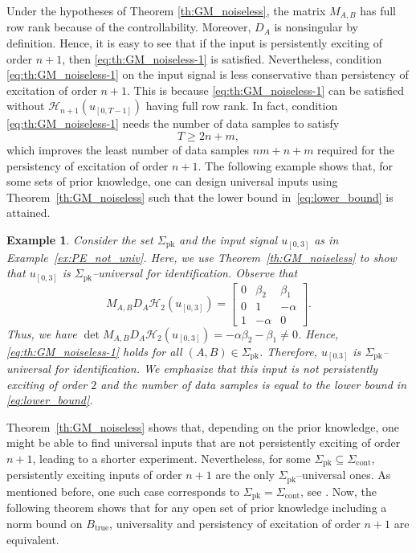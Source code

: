 \documentclass[journal,twoside,web]{ieeecolor}
\newtheorem{example}[theorem]{Example}
\begin{document}
Under the hypotheses of Theorem \ref{th:GM_noiseless}, the matrix $M_{A,B}$ has full row rank because of the controllability. Moreover, $D_A$ is nonsingular by definition. Hence, it is easy to see that if the input is persistently exciting of order $n+1$, then \eqref{eq:th:GM_noiseless-1} is satisfied. Nevertheless, condition \eqref{eq:th:GM_noiseless-1} on the input signal is less conservative than persistency of excitation of order $n+1$. This is because \eqref{eq:th:GM_noiseless-1} can be satisfied without $\mathcal{H}_{n+1}(u_{[0,T-1]}) $ having full row rank. In fact, condition \eqref{eq:th:GM_noiseless-1} needs the number of data samples to satisfy
\begin{equation}
\label{eq:lower_bound}
T\geq2n+m,
\end{equation}
which improves the least number of data samples $nm+n+m$ required for the persistency of excitation of order $n+1$. The following example shows that, for some sets of prior knowledge, one can design universal inputs using Theorem~\ref{th:GM_noiseless} such that the lower bound in~\eqref{eq:lower_bound} is attained.

\begin{example}
Consider the set $\Sigma_\text{pk}$ and the input signal $u_{[0,3]}$ as in Example~\ref{ex:PE_not_univ}. Here, we use Theorem~\ref{th:GM_noiseless} to show that $u_{[0,3]}$ is $\Sigma_\text{pk}$--universal for identification. Observe that 
\begin{equation}
M_{A,B}D_A\mathcal{H}_{2}(u_{[0,3]})=\begin{bmatrix}
0 & \beta_2 & \beta_1 \\
0 & 1  & -\alpha \\
1 & -\alpha &  0
\end{bmatrix}.
\end{equation}
Thus, we have \mbox{$\det M_{A,B}D_A\mathcal{H}_{2}(u_{[0,3]})=- \alpha\beta_2-\beta_1\neq 0$}. Hence, \eqref{eq:th:GM_noiseless-1} holds for all $(A,B)\in\Sigma_\text{pk}$. Therefore, $u_{[0.3]}$ is $\Sigma_\text{pk}$--universal for identification. We emphasize that this input is not persistently exciting of order $2$ and the number of data samples is equal to the lower bound in \eqref{eq:lower_bound}.
\end{example}



Theorem~\ref{th:GM_noiseless} shows that, depending on the prior knowledge, one might be able to find universal inputs that are not persistently exciting of order $n+1$, leading to a shorter experiment. Nevertheless, for some $\Sigma_\text{pk}\subseteq\Sigma_\text{cont}$, persistently exciting inputs of order $n+1$ are the only $\Sigma_\text{pk}$--universal ones. As mentioned before, one such case corresponds to $\Sigma_\text{pk}=\Sigma_\text{cont}$, see \cite[Thm. 4]{shakouri2025new}. Now, the following theorem shows that for any open set of prior knowledge including a norm bound on $B_\text{true}$, universality and persistency of excitation of order $n+1$ are equivalent. 
\end{document}
